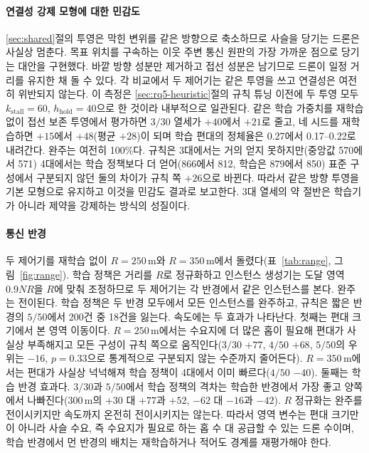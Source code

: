 \documentclass[final,5p,times,twocolumn]{elsarticle}
\begin{document}
\paragraph{연결성 강제 모형에 대한 민감도}
\label{sec:sensitivity}
\ref{sec:shared}절의 투영은 막힌 변위를 같은 방향으로 축소하므로 사슬을 당기는 드론은 사실상
멈춘다. 목표 위치를 구속하는 이웃 주변 통신 원판의 가장 가까운 점으로 당기는 대안을 구현했다.
바깥 방향 성분만 제거하고 접선 성분은 남기므로 드론이 일정 거리를 유지한 채 돌 수 있다. 각 비교에서
두 제어기는 같은 투영을 쓰고 연결성은 여전히 위반되지 않는다. 이 측정은
\ref{sec:rq5-heuristic}절의 규칙 튜닝 이전에 두 투영 모두 $k_{\mathrm{stall}}=60$,
$h_{\mathrm{hold}}=40$으로 한 것이라 내부적으로 일관된다. 같은 학습 가중치를 재학습 없이 접선 보존
투영에서 평가하면 $3/30$ 열세가 $+40$에서 $+21$로 줄고, 네 시드를 재학습하면 $+15$에서 $+48$(평균
$+28$)이 되며 학습 편대의 정체율은 0.27에서 0.17--0.22로 내려간다. 완주는 여전히 100\%다.
규칙은 3대에서는 거의 얻지 못하지만(중앙값 570에서 571) 4대에서는 학습 정책보다 더 얻어(866에서
812, 학습은 879에서 850) 표준 구성에서 구분되지 않던 둘의 차이가 규칙 쪽 $+26$으로 바뀐다. 따라서 같은 방향 투영을
기본 모형으로 유지하고 이것을 민감도 결과로 보고한다. 3대 열세의 약 절반은 학습기가 아니라 제약을
강제하는 방식의 성질이다.

\paragraph{통신 반경}
두 제어기를 재학습 없이 $R = 250$\,m와 $R = 350$\,m에서 돌렸다(표~\ref{tab:range},
그림~\ref{fig:range}). 학습 정책은 거리를 $R$로 정규화하고 인스턴스 생성기는 도달 영역 $0.9NR$을
$R$에 맞춰 조정하므로 두 제어기는 각 반경에서 같은 인스턴스를 본다. 완주는 전이된다. 학습 정책은 두
반경 모두에서 모든 인스턴스를 완주하고, 규칙은 짧은 반경의 $5/50$에서 200건 중 18건을 잃는다.
속도에는 두 효과가 나타난다. 첫째는 편대 크기에서 본 영역 이동이다. $R=250$\,m에서는 수요지에 더
많은 홉이 필요해 편대가 사실상 부족해지고 모든 구성이 규칙 쪽으로 움직인다($3/30$ $+77$,
$4/50$ $+68$, $5/50$의 우위는 $-16$, $p=0.33$으로 통계적으로 구분되지 않는 수준까지 줄어든다). $R=350$\,m에서는 편대가 사실상
넉넉해져 학습 정책이 4대에서 이미 빠르다($4/50$ $-40$). 둘째는 학습 반경 효과다. $3/30$과 $5/50$에서
학습 정책의 격차는 학습한 반경에서 가장 좋고 양쪽에서 나빠진다(300\,m의 $+30$ 대 $+77$과 $+52$,
$-62$ 대 $-16$과 $-42$). $R$ 정규화는 완주를 전이시키지만 속도까지 온전히 전이시키지는 않는다.
따라서 영역 변수는 편대 크기만이 아니라 사슬 수요, 즉 수요지가 필요로 하는 홉 수 대 공급할 수 있는
드론 수이며, 학습 반경에서 먼 반경의 배치는 재학습하거나 적어도 경계를 재평가해야 한다.
\end{document}
